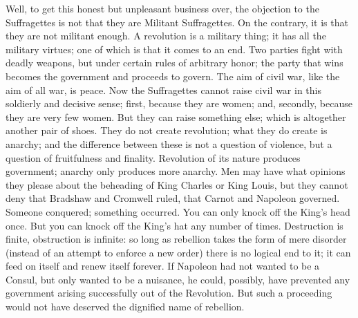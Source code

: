 \documentclass[final,10pt,letterpaper,twocolumn,openany]{book}
\begin{document}
Well, to get this honest but unpleasant business over, the objection to
the Suffragettes is not that they are Militant Suffragettes. On the contrary,
it is that they are not militant enough. A revolution is a military thing; it
has all the military virtues; one of which is that it comes to an end. Two
parties fight with deadly weapons, but under certain rules of arbitrary
honor; the party that wins becomes the government and proceeds to
govern. The aim of civil war, like the aim of all war, is peace. Now the
Suffragettes cannot raise civil war in this soldierly and decisive sense; first,
because they are women; and, secondly, because they are very few women.
But they can raise something else; which is altogether another pair of
shoes. They do not create revolution; what they do create is anarchy; and
the difference between these is not a question of violence, but a question
of fruitfulness and finality. Revolution of its nature produces government;
anarchy only produces more anarchy. Men may have what opinions they
please about the beheading of King Charles or King Louis, but they cannot
deny that Bradshaw and Cromwell ruled, that Carnot and Napoleon
governed. Someone conquered; something occurred. You can only knock
off the King's head once. But you can knock off the King's hat any number
of times. Destruction is finite, obstruction is infinite: so long as rebellion
takes the form of mere disorder (instead of an attempt to enforce a new
order) there is no logical end to it; it can feed on itself and renew itself
forever. If Napoleon had not wanted to be a Consul, but only wanted to be
a nuisance, he could, possibly, have prevented any government arising
successfully out of the Revolution. But such a proceeding would not have
deserved the dignified name of rebellion.
\end{document}
